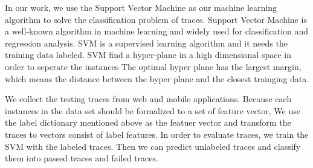 In our work, we use the Support Vector Machine as our machine learning algorithm to solve the classification problem of traces.
Support Vector Machine is a well-known algorithm in machine learning and widely used for classification and regression analysis.
SVM is a supervised learning algorithm and it needs the training data labeled.
SVM find a hyper-plane in a high dimensional space in order to seperate the instances
The optimal hyper plane has the largest margin, which means the distance between the hyper plane and the closest trainging data. 

We collect the testing traces from web and mobile applications.
Because each instances in the data set should be formalized to a set of feature vector,
We use the label dictionary mentioned above as the featuer vector and transform the traces to vectors consist of label features.
In order to evaluate traces, we train the SVM with the labeled traces.
Then we can predict unlabeled traces and classify them into passed traces and failed traces.




